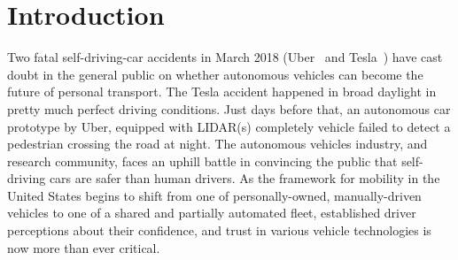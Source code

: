 \section{Introduction}
\label{sec:introduction}


Two fatal self-driving-car accidents in March 2018 (Uber~\cite{uber} and Tesla~\cite{tesla}) have cast doubt in the general public on whether autonomous vehicles can become the future of personal transport. 
The Tesla accident happened in broad daylight in pretty much perfect driving conditions. Just days before that, an autonomous car prototype by Uber, equipped with LIDAR(s) completely vehicle failed to detect a pedestrian crossing the road at night. 
The autonomous vehicles industry, and research community, faces an uphill battle in convincing the public that self-driving cars are safer than human drivers.
As the framework for mobility in the United States begins to shift from one of personally-owned, manually-driven vehicles to one of a shared and partially automated fleet, established driver perceptions about their confidence, and trust in various vehicle technologies is now more than ever critical.


